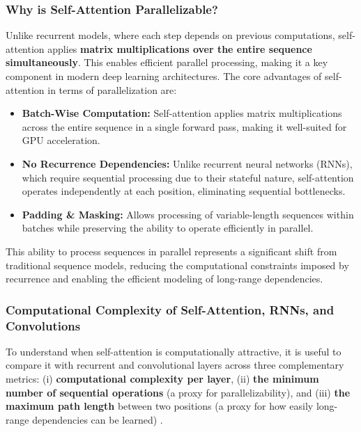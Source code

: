 \subsubsection{Why is Self-Attention Parallelizable?}

\noindent Unlike recurrent models, where each step depends on previous computations, self-attention applies \textbf{matrix multiplications over the entire sequence simultaneously}. This enables efficient parallel processing, making it a key component in modern deep learning architectures. The core advantages of self-attention in terms of parallelization are:

\begin{itemize}
    \item \textbf{Batch-Wise Computation:} Self-attention applies matrix multiplications across the entire sequence in a single forward pass, making it well-suited for GPU acceleration.
    \item \textbf{No Recurrence Dependencies:} Unlike recurrent neural networks (RNNs), which require sequential processing due to their stateful nature, self-attention operates independently at each position, eliminating sequential bottlenecks.
    \item \textbf{Padding \& Masking:} Allows processing of variable-length sequences within batches while preserving the ability to operate efficiently in parallel.
\end{itemize}

\noindent This ability to process sequences in parallel represents a significant shift from traditional sequence models, reducing the computational constraints imposed by recurrence and enabling the efficient modeling of long-range dependencies.

\subsubsection{Computational Complexity of Self-Attention, RNNs, and Convolutions}
\label{subsubsec:chapter17_complexity_layers}

\noindent
To understand when self-attention is computationally attractive, it is useful to compare it with recurrent and convolutional layers across three complementary metrics:
(i) \textbf{computational complexity per layer}, 
(ii) \textbf{the minimum number of sequential operations} (a proxy for parallelizability), and
(iii) \textbf{the maximum path length} between two positions (a proxy for how easily long-range dependencies can be learned) \cite{vaswani2017_attention}.

